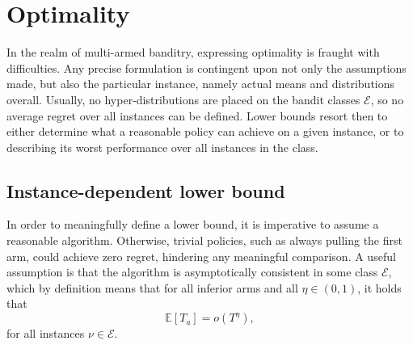\section{Optimality}
\label{sec:optimality}
In the realm of multi-armed banditry, expressing optimality is fraught with difficulties.
Any precise formulation is contingent upon not only the assumptions made, but also the particular instance, namely actual means and distributions overall.
Usually, no hyper-distributions are placed on the bandit classes $\mathcal{E}$, so no average regret over all instances can be defined.
Lower bounds resort then to either determine what a reasonable policy can achieve on a given instance, or to describing its worst performance over all instances in the class.

\subsection{Instance-dependent lower bound}
In order to meaningfully define a lower bound, it is imperative to assume a reasonable algorithm.
Otherwise, trivial policies, such as always pulling the first arm, could achieve zero regret, hindering any meaningful comparison.
A useful assumption is that the algorithm is asymptotically consistent in some class $\mathcal{E}$, which by definition means that for all inferior arms and all $\eta \in (0, 1)$, it holds that
\begin{equation}
    \mathbb{E}[T_a] = o(T^{\eta}),
\end{equation}
for all instances $\nu \in \mathcal{E}$.


